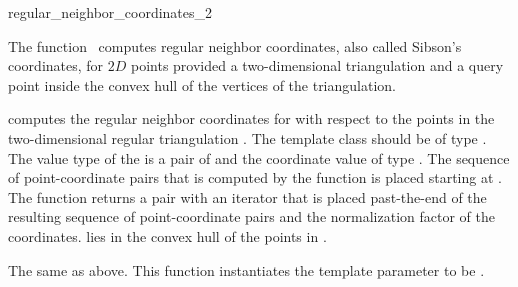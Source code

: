 
\begin{ccRefFunction}{regular_neighbor_coordinates_2}  %

\ccDefinition
  
The function \ccRefName\ computes regular neighbor coordinates, also
called Sibson's coordinates, for $2D$ points provided a two-dimensional
triangulation and a query point inside the convex hull of the vertices
of the triangulation.



 {
  computes the regular neighbor coordinates for  with respect
  to the points in the two-dimensional regular triangulation .
  The template class  should be of type
  .  The value type of the
   is a pair of  and the
  coordinate value of type . The sequence of
  point-coordinate pairs that is computed by the function is placed
  starting at . The function returns a pair with an iterator
  that is placed past-the-end of the resulting sequence of
  point-coordinate pairs and the normalization factor of the
  coordinates.
  \ccPrecond %
   lies in the convex hull of the
  points in .
  }  

%
{The same as above. This function instantiates the template parameter
   to be .}



\end{ccRefFunction}
